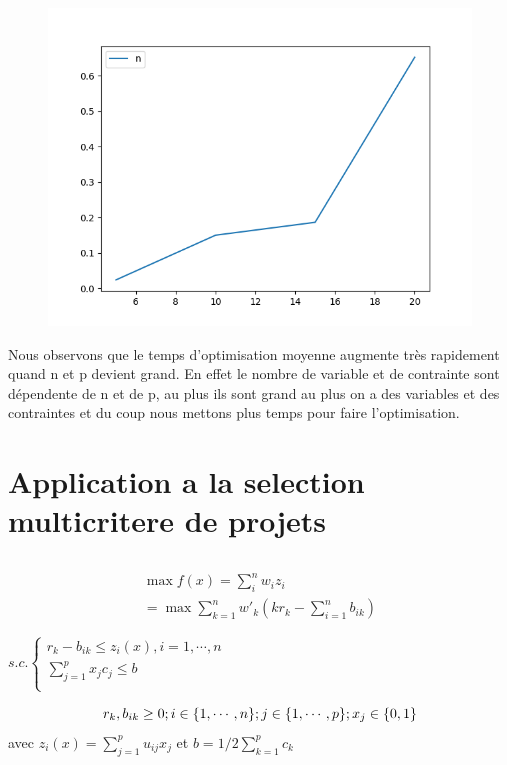 \documentclass[16pt, a4paper]{article}
\begin{document}
\begin{flushleft}
\begin{justify}
\newpage
\begin{figure}[!ht]
    \centering
    {\includegraphics[scale=0.8]{imgs/2.2.png}}
\end{figure}

Nous observons que le temps d'optimisation moyenne augmente très rapidement quand n et p devient grand. En effet le nombre de variable et de contrainte sont dépendente de n et de p, au plus ils sont grand au plus on a des variables et des contraintes et du coup nous mettons plus temps pour faire l'optimisation.


\newpage
\section{Application a la selection multicritere de projets}
\subsection{}

\begin{align*}
    \max f(x) =  \sum_{i}^n w_iz_i \\
    = \max \sum_{k=1}^n w'_k(kr_k- \sum_{i=1}^n b_{ik})
\end{align*}

\begin{center}
$ s.c.  \begin{cases}
r_k - b_{ik} \leq z_i(x) , i = 1,\cdots,n\\
\sum_{j = 1}^p x_{j}c_j \leq b\\
        \end{cases} $
\end{center}
$$ r_{k}, b_{ik} \geq 0 ; i\in \{1,\cdots, n\} ; j \in \{1,\cdots,p\} ; x_{j} \in \{0,1\}\\$$
avec $z_i(x) = \sum_{j=1}^p u_{ij}x_{j}$ et $ b = 1/2 \sum_{k=1}^p c_k $\\


\end{justify}
\end{flushleft}
\end{document}
